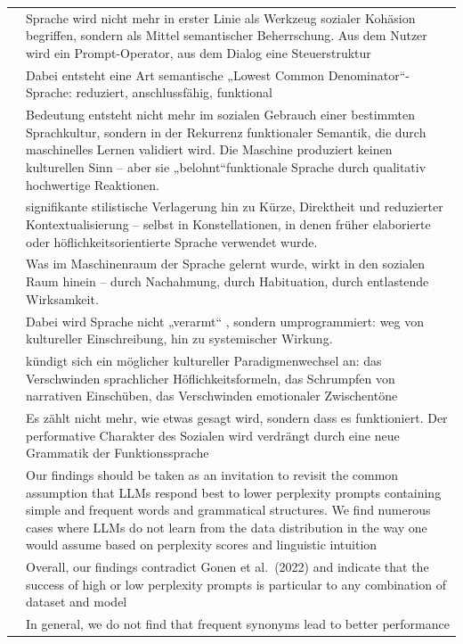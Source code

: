\documentclass[
  letterpaper,
  DIV=11,
  numbers=noendperiod]{scrartcl}
\begin{document}
\begin{longtable}[]{@{}
  >{\raggedleft\arraybackslash}p{}
  >{\raggedright\arraybackslash}p{}@{}}
65 & Sprache wird nicht mehr in erster Linie als Werkzeug sozialer
Kohäsion begriffen, sondern als Mittel semantischer Beherrschung. Aus
dem Nutzer wird ein Prompt-Operator, aus dem Dialog eine
Steuerstruktur \\
66 & Dabei entsteht eine Art semantische „Lowest Common
Denominator``-Sprache: reduziert, anschlussfähig, funktional \\
67 & Bedeutung entsteht nicht mehr im sozialen Gebrauch einer bestimmten
Sprachkultur, sondern in der Rekurrenz funktionaler Semantik, die durch
maschinelles Lernen validiert wird. Die Maschine produziert keinen
kulturellen Sinn -- aber sie „belohnt``funktionale Sprache durch
qualitativ hochwertige Reaktionen. \\
68 & signifikante stilistische Verlagerung hin zu Kürze, Direktheit und
reduzierter Kontextualisierung -- selbst in Konstellationen, in denen
früher elaborierte oder höflichkeitsorientierte Sprache verwendet
wurde. \\
69 & Was im Maschinenraum der Sprache gelernt wurde, wirkt in den
sozialen Raum hinein -- durch Nachahmung, durch Habituation, durch
entlastende Wirksamkeit. \\
70 & Dabei wird Sprache nicht „verarmt`` , sondern umprogrammiert: weg
von kultureller Einschreibung, hin zu systemischer Wirkung. \\
71 & kündigt sich ein möglicher kultureller Paradigmenwechsel an: das
Verschwinden sprachlicher Höflichkeitsformeln, das Schrumpfen von
narrativen Einschüben, das Verschwinden emotionaler Zwischentöne \\
72 & Es zählt nicht mehr, wie etwas gesagt wird, sondern dass es
funktioniert. Der performative Charakter des Sozialen wird verdrängt
durch eine neue Grammatik der Funktionssprache \\
73 & Our findings should be taken as an invitation to revisit the common
assumption that LLMs respond best to lower perplexity prompts containing
simple and frequent words and grammatical structures. We find numerous
cases where LLMs do not learn from the data distribution in the way one
would assume based on perplexity scores and linguistic intuition \\
74 & Overall, our findings contradict Gonen et al.~(2022) and indicate
that the success of high or low perplexity prompts is particular to any
combination of dataset and model \\
75 & In general, we do not find that frequent synonyms lead to better
performance \\
\end{longtable}
\end{document}
